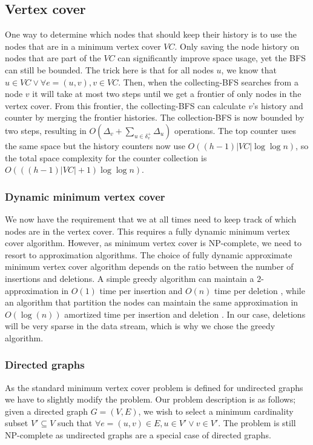 \subsection{Vertex cover}
One way to determine which nodes that should keep their history is to use the nodes that are in a minimum vertex cover $VC$. Only saving the node history on nodes that are part of the $VC$ can significantly improve space usage, yet the BFS can still be bounded. The trick here is that for all nodes $u$, we know that $u \in VC \vee \forall e = (u,v), v \in VC$. Then, when the collecting-BFS searches from a node $v$ it will take at most two steps until we get a frontier of only nodes in the vertex cover. From this frontier, the collecting-BFS can calculate $v$'s history and counter by merging the frontier histories. The collection-BFS is now bounded by two steps, resulting in $O(\Delta_v + \sum_{u \in \delta^+_v}{\Delta_u}) $ operations. The top counter uses the same space but the history counters now use $O((h-1)|VC| \log \log n)$, so the total space complexity for the counter collection is $O(((h-1)|VC| + 1 )\log \log n)$.


\subsubsection{Dynamic minimum vertex cover}
We now have the requirement that we at all times need to keep track of which nodes are in the vertex cover. This requires a fully dynamic minimum vertex cover algorithm. However, as minimum vertex cover is NP-complete, we need to resort to approximation algorithms. The choice of fully dynamic approximate minimum vertex cover algorithm depends on the ratio between the number of insertions and deletions. A simple greedy algorithm can maintain a $2$-approximation in $O(1)$ time per insertion and $O(n)$ time per deletion \cite{2appdynvc}, while an algorithm that partition the nodes can maintain the same approximation in $O(\log(n))$ amortized time per insertion and deletion \cite{2appdynvclogn}. In our case,  deletions will be very sparse in the data stream, which is why we chose the greedy algorithm. 
 
\subsubsection{Directed graphs}
As the standard minimum vertex cover problem is defined for undirected graphs we have to slightly modify the problem. Our problem description is as follows; given a directed graph $G = (V,E)$, we wish to select a minimum cardinality subset $V' \subseteq V$ such that $\forall e = (u,v) \in E, u \in V' \vee v \in V'$. The problem is still NP-complete as undirected graphs are a special case of directed graphs. 

